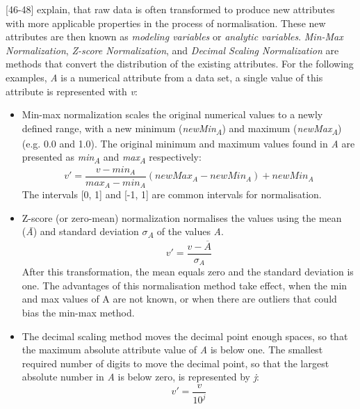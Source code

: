 \textcite{dataPreprocessingInDataMining}[46-48] explain, that raw data is often transformed to produce new attributes with more applicable properties in the process of normalisation. These new attributes are then known as \textit{modeling variables} or \textit{analytic variables}. 
\textit{Min-Max Normalization}, \textit{Z-score Normalization}, and \textit{Decimal Scaling Normalization} are methods that convert the distribution of the existing attributes. For the following examples, \textit{A} is a numerical attribute from a data set, a single value of this attribute is represented with \textit{v}:
\begin{itemize}
  \item Min-max normalization scales the original numerical values to a newly defined range, with a new minimum (\textit{newMin\textsubscript{A}}) and maximum (\textit{newMax\textsubscript{A}}) (e.g. 0.0 and 1.0). The original minimum and maximum values found in \textit{A} are presented as \textit{min\textsubscript{A}} and \textit{max\textsubscript{A}} respectively:
  \[
    v' = \frac{v - min_A}{max_A - min_A}(newMax_A - newMin_A) + newMin_A
  \]
  The intervals [0, 1] and [-1, 1] are common intervals for normalisation. 

  \item Z-score (or zero-mean) normalization normalises the values using the mean (\textit{\={A}}) and standard deviation \textit{$\sigma$\textsubscript{A}} of the values \textit{A}.
  \[
    v' = \frac{v - \overline{A}}{\sigma_A}
  \]
  After this transformation, the mean equals zero and the standard deviation is one. The advantages of this normalisation method take effect, when the min and max values of A are not known, or when there are outliers that could bias the min-max method.

  \item The decimal scaling method moves the decimal point enough spaces, so that the maximum absolute attribute value of \textit{A} is below one. The smallest required number of digits to move the decimal point, so that the largest absolute number in \textit{A} is below zero, is represented by \textit{j}:
  \[
    v' = \frac{v}{10^j}
  \]
\end{itemize}




